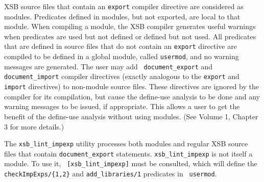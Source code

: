 XSB source files that contain an {\tt export} compiler directive are
considered as modules.  Predicates defined in modules, but not
exported, are local to that module.  When compiling a module, the XSB
compiler generates useful warnings when predicates are used but not
defined or defined but not used.  All predicates that are defined in
source files that do not contain an {\tt export} directive are
compiled to be defined in a global module, called {\tt usermod}, and
no warning messages are generated.  The user may add {\tt
document\_export} and {\tt document\_import} compiler directives
(exactly analogous to the {\tt export} and {\tt import} directives) to
non-module source files.  These directives are ignored by the compiler
for its compilation, but cause the define-use analysis to be done and
any warning messages to be issued, if appropriate.  This allows a user
to get the benefit of the define-use analysis without using modules.
(See Volume 1, Chapter 3 for more details.)

The {\tt xsb\_lint\_impexp} utility processes both modules and regular
XSB source files that contain {\tt document\_export} statements.
%
{\tt xsb\_lint\_impexp} is not itself a module.  To use it, {\tt
[xsb\_lint\_impexp]} must be consulted, which will define the {\tt
checkImpExps/\{1,2\}} and {\tt add\_libraries/1} predicates in {\tt
usermod}.

